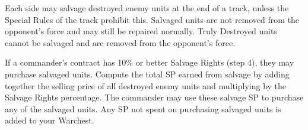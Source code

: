 Each side may salvage destroyed enemy units at the end of a track, unless the Special Rules of the track prohibit this.
Salvaged units are not removed from the opponent's force and may still be repaired normally.
Truly Destroyed units cannot be salvaged and are removed from the opponent's force.

If a commander's contract has 10\% or better Salvage Rights (step 4), they may purchase salvaged units.
Compute the total SP earned from salvage by adding together the selling price of all destroyed enemy units and multiplying by the Salvage Rights percentage.
The commander may use these salvage SP to purchase any of the salvaged units.
Any SP not spent on purchasing salvaged units is added to your Warchest.
